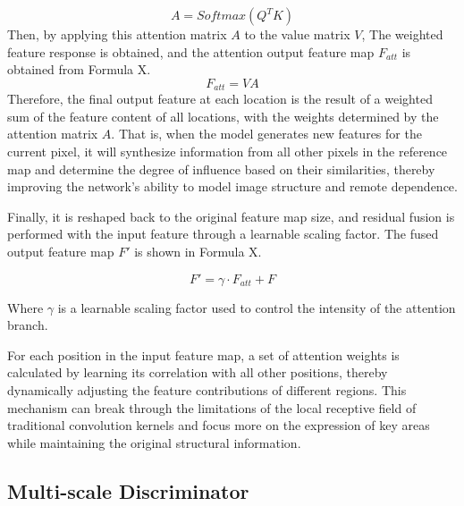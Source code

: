 \documentclass[a4paper,fleqn]{cas-sc}
\begin{document}
\begin{equation}
	A = Softmax(Q^TK)
\end{equation}
Then, by applying this attention matrix $A$ to the value matrix $V$, The weighted feature response is obtained, and the attention output feature map $F_{att}$ is obtained from Formula X. 
\begin{equation}
	F_{att} = VA
\end{equation}
Therefore, the final output feature at each location is the result of a weighted sum of the feature content of all locations, with the weights determined by the attention matrix $A$. That is, when the model generates new features for the current pixel, it will synthesize information from all other pixels in the reference map and determine the degree of influence based on their similarities, thereby improving the network's ability to model image structure and remote dependence. 

Finally, it is reshaped back to the original feature map size, and residual fusion is performed with the input feature through a learnable scaling factor. The fused output feature map $F'$ is shown in Formula X. 

\begin{equation}
	F'= \gamma \cdot F_{att} +F
\end{equation}

Where $\gamma$ is a learnable scaling factor used to control the intensity of the attention branch. 

For each position in the input feature map, a set of attention weights is calculated by learning its correlation with all other positions, thereby dynamically adjusting the feature contributions of different regions. This mechanism can break through the limitations of the local receptive field of traditional convolution kernels and focus more on the expression of key areas while maintaining the original structural information. 

\subsection{Multi-scale Discriminator}
\end{document}
